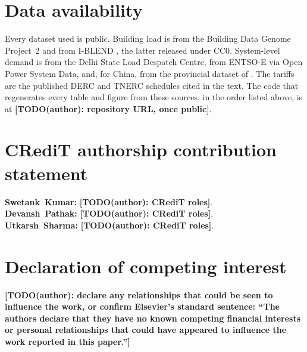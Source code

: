 \documentclass[preprint,11pt]{elsarticle}
\newcommand{\authortodo}[1]{{\color{red}\textbf{[TODO(author): #1]}}}
\begin{document}

















\section*{Data availability}
Every dataset used is public. Building load is from the Building Data Genome
Project~2 \citep{miller2020bdg2} and from I-BLEND \citep{rashid2019iblend}, the
latter released under CC0. System-level demand is from the Delhi State Load Despatch Centre,
from ENTSO-E via Open Power System Data, and, for China, from the provincial
dataset of \citet{wu2023china}. The tariffs are the published DERC and TNERC
schedules cited in the text. The code that regenerates every table and figure
from these sources, in the order listed above, is at
\authortodo{repository URL, once public}.

\section*{CRediT authorship contribution statement}
\noindent\textbf{Swetank~Kumar:} \authortodo{CRediT roles}.\\
\textbf{Devansh~Pathak:} \authortodo{CRediT roles}.\\
\textbf{Utkarsh~Sharma:} \authortodo{CRediT roles}.

\section*{Declaration of competing interest}
\authortodo{declare any relationships that could be seen to influence the work,
or confirm Elsevier's standard sentence: ``The authors declare that they have no
known competing financial interests or personal relationships that could have
appeared to influence the work reported in this paper.''}
\end{document}
